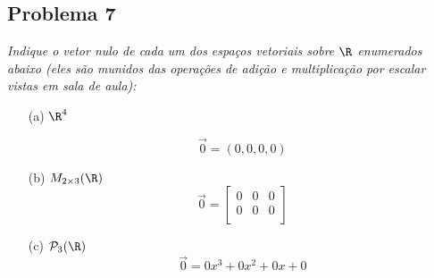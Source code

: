 \subsection*{Problema 7}
  \textit{Indique o  vetor nulo  de cada um  dos espaços vetoriais  sobre $\R$
  enumerados  abaixo  (eles são  munidos  das  operações  de adição  e
  multiplicação por escalar vistas em sala de aula):}
\begin{itemize}
\item[(a)] $\R^4$

\[
  \vec{0} = \left ( 0, 0, 0, 0 \right )
\]

\item[(b)] $M_{2 \times 3}( \R )$
\[
  \vec{0} = \left [ \begin{array}{ccc}
  0 & 0 & 0\\
  0 & 0 & 0\\
  \end{array} \right ]
\]


\item[(c)] $\mathcal{P}_3( \R )$
\[
  \vec{0} = 0x^3 + 0x^2 + 0x + 0
\]
\end{itemize}